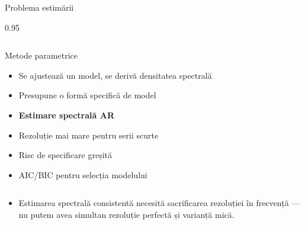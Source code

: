 \documentclass[9pt, aspectratio=169, t]{beamer}
\begin{document}
\begin{frame}{Problema estimării}
\begin{cminipage}{0.95\textwidth}
\begin{columns}[T]
        \begin{alertblock}{Metode parametrice}
            \begin{itemize}\setlength{\itemsep}{-2pt}
                \item Se ajustează un model, se derivă densitatea spectrală
                \item Presupune o formă specifică de model
                \item \textbf{Estimare spectrală AR}
                \item Rezoluție mai mare pentru serii scurte
                \item Risc de specificare greșită
                \item AIC/BIC pentru selecția modelului
            \end{itemize}
        \end{alertblock}
    \end{columns}
    \vspace{-1mm}
    \begin{itemize}\setlength{\itemsep}{0pt}
        \item[\textbf{Observație cheie}:] {\small Estimarea spectrală consistentă necesită sacrificarea rezoluției în frecvență --- nu putem avea simultan rezoluție perfectă și varianță mică.}
    \end{itemize}
    \end{cminipage}
\end{frame}
\end{document}
